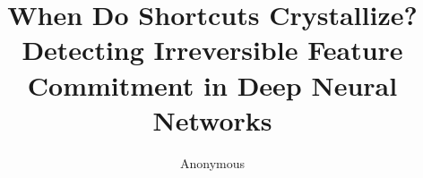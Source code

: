 \documentclass[letterpaper]{article}
\title{When Do Shortcuts Crystallize? Detecting Irreversible Feature Commitment in Deep Neural Networks}
\author{Anonymous}
\date{}
\begin{document}
\maketitle

\begin{abstract}

\end{abstract}











\end{document}
